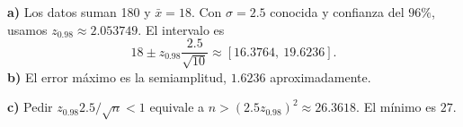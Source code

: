 \textbf{a)} Los datos suman 180 y $\bar x=18$. Con
$\sigma=2.5$ conocida y confianza del $96\%$, usamos
$z_{0.98}\approx2.053749$. El intervalo es
\[
18\pm z_{0.98}\frac{2.5}{\sqrt{10}}
\approx\boxed{[16.3764,\ 19.6236]}.
\]
\textbf{b)} El error máximo es la semiamplitud, $\boxed{1.6236}$
aproximadamente.

\textbf{c)} Pedir $z_{0.98}2.5/\sqrt n<1$ equivale a
$n>(2.5z_{0.98})^2\approx26.3618$. El mínimo es $\boxed{27}$.
